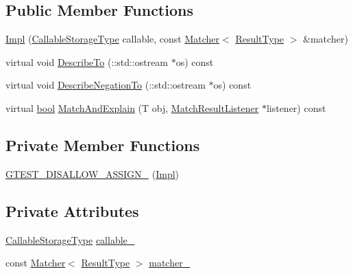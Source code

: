 \subsection*{Public Member Functions}
\begin{DoxyCompactItemize}
\item 
\hyperlink{classtesting_1_1internal_1_1ResultOfMatcher_1_1Impl_aff0e17018118fa5e173d453a735964b2}{Impl} (\hyperlink{classtesting_1_1internal_1_1ResultOfMatcher_a6f7f7d80162bebdf73681d6a3aa92c7d}{Callable\+Storage\+Type} callable, const \hyperlink{classtesting_1_1Matcher}{Matcher}$<$ \hyperlink{classtesting_1_1internal_1_1ResultOfMatcher_aa9db2267792fcae2cfa3f57683f4e048}{Result\+Type} $>$ \&matcher)
\item 
virtual void \hyperlink{classtesting_1_1internal_1_1ResultOfMatcher_1_1Impl_ac414587b112d9fec788366c026fbb485}{Describe\+To} (\+::std\+::ostream $\ast$os) const
\item 
virtual void \hyperlink{classtesting_1_1internal_1_1ResultOfMatcher_1_1Impl_a0cce532e88284a2939fc6b63cadc51a6}{Describe\+Negation\+To} (\+::std\+::ostream $\ast$os) const
\item 
virtual \hyperlink{classbool}{bool} \hyperlink{classtesting_1_1internal_1_1ResultOfMatcher_1_1Impl_a4f9d7dfdad8ad8f1ab4f5ffe11c26763}{Match\+And\+Explain} (T obj, \hyperlink{classtesting_1_1MatchResultListener}{Match\+Result\+Listener} $\ast$listener) const
\end{DoxyCompactItemize}
\subsection*{Private Member Functions}
\begin{DoxyCompactItemize}
\item 
\hyperlink{classtesting_1_1internal_1_1ResultOfMatcher_1_1Impl_a8f8bcdced8377cac9a618de793821d63}{G\+T\+E\+S\+T\+\_\+\+D\+I\+S\+A\+L\+L\+O\+W\+\_\+\+A\+S\+S\+I\+G\+N\+\_\+} (\hyperlink{classtesting_1_1internal_1_1ResultOfMatcher_1_1Impl}{Impl})
\end{DoxyCompactItemize}
\subsection*{Private Attributes}
\begin{DoxyCompactItemize}
\item 
\hyperlink{classtesting_1_1internal_1_1ResultOfMatcher_a6f7f7d80162bebdf73681d6a3aa92c7d}{Callable\+Storage\+Type} \hyperlink{classtesting_1_1internal_1_1ResultOfMatcher_1_1Impl_a4020b7c533f4cb147abd5af081308e37}{callable\+\_\+}
\item 
const \hyperlink{classtesting_1_1Matcher}{Matcher}$<$ \hyperlink{classtesting_1_1internal_1_1ResultOfMatcher_aa9db2267792fcae2cfa3f57683f4e048}{Result\+Type} $>$ \hyperlink{classtesting_1_1internal_1_1ResultOfMatcher_1_1Impl_a2ce504e44dae05b5e574e21def4f1cba}{matcher\+\_\+}
\end{DoxyCompactItemize}


